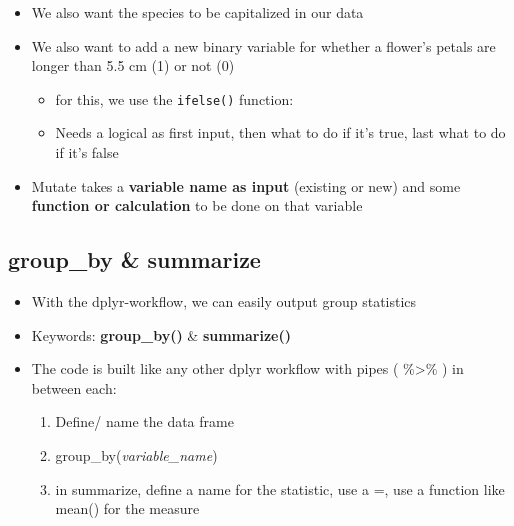 \documentclass[
]{book}
\newenvironment{Shaded}{\begin{snugshade}}{\end{snugshade}}
\newcommand{\AttributeTok}[1]{\textcolor[rgb]{0.13,0.29,0.53}{#1}}
\newcommand{\CommentTok}[1]{\textcolor[rgb]{0.56,0.35,0.01}{\textit{#1}}}
\newcommand{\DecValTok}[1]{\textcolor[rgb]{0.00,0.00,0.81}{#1}}
\newcommand{\FloatTok}[1]{\textcolor[rgb]{0.00,0.00,0.81}{#1}}
\newcommand{\FunctionTok}[1]{\textcolor[rgb]{0.13,0.29,0.53}{\textbf{#1}}}
\newcommand{\NormalTok}[1]{#1}
\newcommand{\OtherTok}[1]{\textcolor[rgb]{0.56,0.35,0.01}{#1}}
\newcommand{\SpecialCharTok}[1]{\textcolor[rgb]{0.81,0.36,0.00}{\textbf{#1}}}
\providecommand{\tightlist}{%
  \setlength{\itemsep}{0pt}\setlength{\parskip}{0pt}}
\begin{document}
\begin{itemize}
\tightlist
\item
  We also want the species to be capitalized in our data
\item
  We also want to add a new binary variable for whether a flower's petals are longer than 5.5 cm (1) or not (0)

  \begin{itemize}
  \tightlist
  \item
    for this, we use the \texttt{ifelse()} function:
  \item
    Needs a logical as first input, then what to do if it's true, last what to do if it's false
  \end{itemize}
\item
  Mutate takes a \textbf{variable name as input} (existing or new) and some \textbf{function or calculation} to be done on that variable
\end{itemize}

\begin{Shaded}
\end{Shaded}

\subsection{group\_by \& summarize}\label{group_by-summarize}

\begin{itemize}
\tightlist
\item
  With the dplyr-workflow, we can easily output group statistics
\item
  Keywords: \textbf{group\_by()} \& \textbf{summarize()}
\item
  The code is built like any other dplyr workflow with pipes ( \%\textgreater\% ) in between each:

  \begin{enumerate}
  \def\labelenumi{\arabic{enumi}.}
  \tightlist
  \item
    Define/ name the data frame
  \item
    group\_by(\emph{variable\_name})
  \item
    in summarize, define a name for the statistic, use a =, use a function like mean() for the measure
  \end{enumerate}
\end{itemize}
\end{document}
